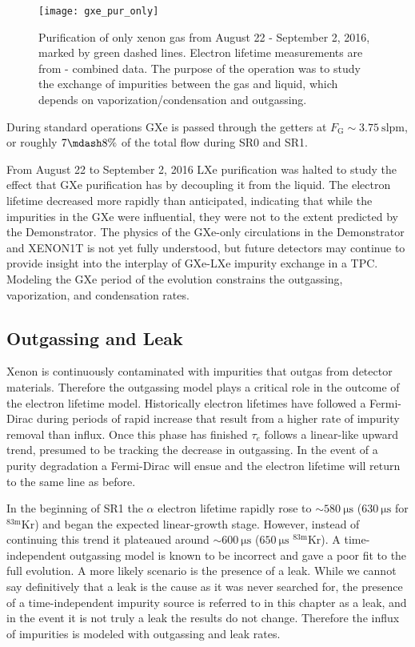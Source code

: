 \begin{figure}
\centering
\texttt{[image: gxe\_pur\_only]}
\caption{Purification of only xenon gas from August 22 - September 2, 2016, marked by green dashed lines.  Electron lifetime measurements
are from - combined data.  The purpose of the operation was to study the exchange of impurities between the
gas and liquid, which depends on vaporization/condensation and outgassing.}
\label{fig:electron_lifetime_model_gxe_xenon1t}
\end{figure}

During standard operations GXe is passed through the getters at $F_{\mathrm{G}} {\sim} 3.75\ \mathrm{slpm}$, or roughly $7 \mdash 8\%$ of
the total flow during SR0 and SR1.

From August 22 to September 2, 2016 LXe purification was halted to study the effect that GXe purification has by
decoupling it from the liquid.  The electron lifetime decreased more rapidly than anticipated, indicating that while the
impurities in the GXe were influential, they were not to the extent predicted by the Demonstrator.  The physics of the GXe-only
circulations in the Demonstrator and XENON1T is not yet fully understood, but future detectors may continue to provide insight into
the interplay of GXe-LXe impurity exchange in a TPC.  Modeling the GXe period of the evolution constrains the outgassing,
vaporization, and condensation rates.



\subsection{Outgassing and Leak}
\label{subsec:electron_lifetime_model_outgassing}
Xenon is continuously contaminated with impurities that outgas from detector materials.  Therefore the outgassing model plays a
critical role in the outcome of the electron lifetime model.  Historically electron lifetimes have followed a Fermi-Dirac during periods
of rapid increase that result from a higher rate of impurity removal than influx.  Once this phase has
finished $\tau_e$ follows a linear-like upward trend, presumed to be tracking the decrease in outgassing.  In the event of a
purity degradation a Fermi-Dirac will ensue and the electron lifetime will return to the same line as before.

In the beginning of SR1 the $\alpha$ electron lifetime rapidly rose to ${\sim} 580\ \mathrm{\mu s}$ ($630\ \mathrm{\mu s}$ for
$\mathrm{^{83m}Kr}$) and began the expected linear-growth stage.  However, instead of continuing this trend
it plateaued around ${\sim} 600\ \mathrm{\mu s}$ ($650\ \mathrm{\mu s}$ $\mathrm{^{83m}Kr}$).  A time-independent outgassing model is
known to be incorrect and
gave a poor fit to the full evolution.  A more likely scenario is the presence of a leak.  While we cannot say definitively that a leak
is the cause as it was never searched for, the presence of a time-independent impurity source is referred to in this chapter as a
leak, and in the event it is not truly a leak the results do not change.  Therefore the influx of impurities is modeled with
outgassing and leak rates.



